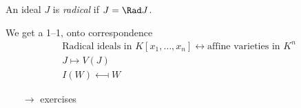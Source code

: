 An ideal $J$ is \emph{radical} if $J=\Rad J$.

We get a 1--1, onto correspondence
\begin{gather*}
\text{Radical ideals in $K[x_1,\dotsc,x_n]$} \longleftrightarrow \text{affine varieties in $K^n$} \\
J \longmapsto V(J) \\
I(W) \longmapsfrom W
\end{gather*}
\begin{itemize}
\item[$\to$] exercises
\end{itemize}
%
